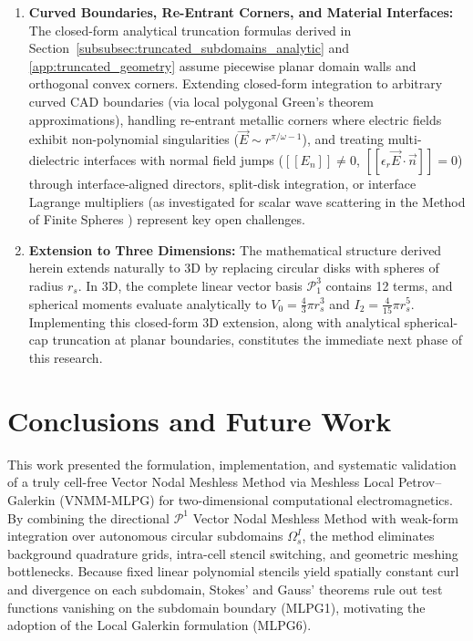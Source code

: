 \documentclass[preprint,12pt]{elsarticle}
\begin{document}
\begin{enumerate}
    \item \textbf{Curved Boundaries, Re-Entrant Corners, and Material Interfaces:} The closed-form analytical truncation formulas derived in Section~\ref{subsubsec:truncated_subdomains_analytic} and \ref{app:truncated_geometry} assume piecewise planar domain walls and orthogonal convex corners. Extending closed-form integration to arbitrary curved CAD boundaries (via local polygonal Green's theorem approximations), handling re-entrant metallic corners where electric fields exhibit non-polynomial singularities ($\vec{E} \sim r^{\pi/\omega - 1}$), and treating multi-dielectric interfaces with normal field jumps ($[\![ E_n ]\!] \ne 0$, $[\![ \epsilon_r \vec{E} \cdot \vec{n} ]\!] = 0$) through interface-aligned directors, split-disk integration, or interface Lagrange multipliers (as investigated for scalar wave scattering in the Method of Finite Spheres \cite{nicomedes2021acoustic}) represent key open challenges.
    \item \textbf{Extension to Three Dimensions:} The mathematical structure derived herein extends naturally to 3D by replacing circular disks with spheres of radius $r_s$. In 3D, the complete linear vector basis $\mathcal{P}_1^3$ contains 12 terms, and spherical moments evaluate analytically to $V_0 = \frac{4}{3}\pi r_s^3$ and $I_2 = \frac{4}{15}\pi r_s^5$. Implementing this closed-form 3D extension, along with analytical spherical-cap truncation at planar boundaries, constitutes the immediate next phase of this research.
\end{enumerate}

\section{Conclusions and Future Work}
\label{sec:conclusions}

This work presented the formulation, implementation, and systematic validation of a truly cell-free Vector Nodal Meshless Method via Meshless Local Petrov--Galerkin (VNMM-MLPG) for two-dimensional computational electromagnetics. By combining the directional $\mathcal{P}^1$ Vector Nodal Meshless Method \cite{ortiz2021nodal, stable_vnmm2d_2026} with weak-form integration over autonomous circular subdomains $\Omega_s^I$, the method eliminates background quadrature grids, intra-cell stencil switching, and geometric meshing bottlenecks. Because fixed linear polynomial stencils yield spatially constant curl and divergence on each subdomain, Stokes' and Gauss' theorems rule out test functions vanishing on the subdomain boundary (MLPG1), motivating the adoption of the Local Galerkin formulation (MLPG6).
\end{document}
